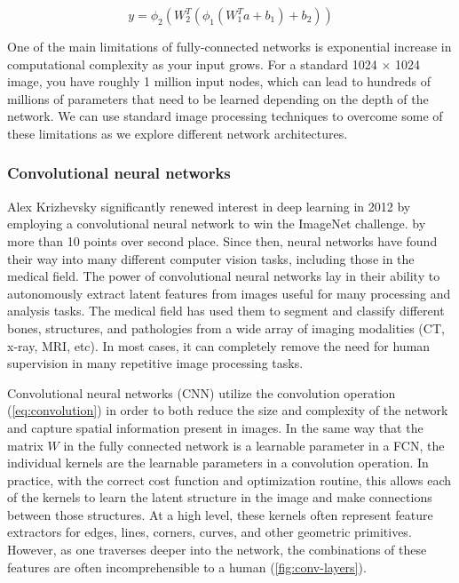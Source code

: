 \begin{equation}
    y = \phi_2 (W_2^{T}(\phi_1(W_1^{T}a + b_1) + b_2))
    \label{eq:2-layer-fcn}
\end{equation}

One of the main limitations of fully-connected networks is exponential increase in computational complexity as your input grows.
For a standard 1024 $\times$ 1024 image, you have roughly 1 million input nodes, which can lead to hundreds of millions of parameters that need to be learned depending on the depth of the network.
We can use standard image processing techniques to overcome some of these limitations as we explore different network architectures.

\subsubsection{Convolutional neural networks}

Alex Krizhevsky significantly renewed interest in deep learning in 2012 by employing a convolutional neural network to win the ImageNet challenge. \cite{russakovskyImageNetLargeScale2015} by more than 10 points over second place.
Since then, neural networks have found their way into many different computer vision tasks, including those in the medical field.
The power of convolutional neural networks lay in their ability to autonomously extract latent features from images useful for many processing and analysis tasks.
The medical field has used them to segment and classify different bones, structures, and pathologies from a wide array of imaging modalities (CT, x-ray, MRI, etc).
In most cases, it can completely remove the need for human supervision in many repetitive image processing tasks.

Convolutional neural networks (CNN) utilize the convolution operation (\cref{eq:convolution}) in order to both reduce the size and complexity of the network and capture spatial information present in images.
In the same way that the matrix $W$ in the fully connected network is a learnable parameter in a FCN, the individual kernels are the learnable parameters in a convolution operation.
In practice, with the correct cost function and optimization routine, this allows each of the kernels to learn the latent structure in the image and make connections between those structures.
At a high level, these kernels often represent feature extractors for edges, lines, corners, curves, and other geometric primitives.
However, as one traverses deeper into the network, the combinations of these features are often incomprehensible to a human (\cref{fig:conv-layers}).

